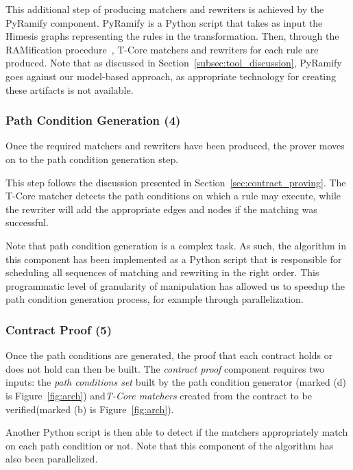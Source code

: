 This additional step of producing matchers and rewriters is achieved by the PyRamify component. PyRamify is a Python script that takes as input the Himesis graphs representing the rules in the transformation. Then, through the RAMification procedure~\cite{KuhneMSVW09}, T-Core matchers and rewriters for each rule are produced. Note that as discussed in Section~\ref{subsec:tool_discussion}, PyRamify goes against our model-based approach, as appropriate technology for creating these artifacts is not available.


\subsubsection{Path Condition Generation (4)}

Once the required matchers and rewriters have been produced, the prover moves
on to the path condition generation step.

This step follows the discussion presented in Section~\ref{sec:contract_proving}. The T-Core matcher detects the path conditions on which a rule may execute, while the rewriter will add the appropriate edges and nodes if the matching was successful.

Note that path condition generation is a complex task. As such, the algorithm in this component has been implemented as a Python script
that is responsible for scheduling all sequences of matching and rewriting in the right order. This programmatic level of granularity of manipulation has allowed us to speedup the path condition generation process, for example through parallelization.
 
\subsubsection{Contract Proof (5)}

Once the path conditions are generated, the proof that each contract holds or
does not hold can then be built. The \emph{contract proof} component requires
two inputs: the \emph{path conditions set} built by the path condition generator
(marked (d) is Figure~\ref{fig:arch}) and\emph{T-Core matchers} created from the contract to be verified(marked (b) is Figure~\ref{fig:arch}).

Another Python script is then able to detect if the matchers appropriately match on each path condition or not.  Note that this component of the algorithm has also been parallelized.

